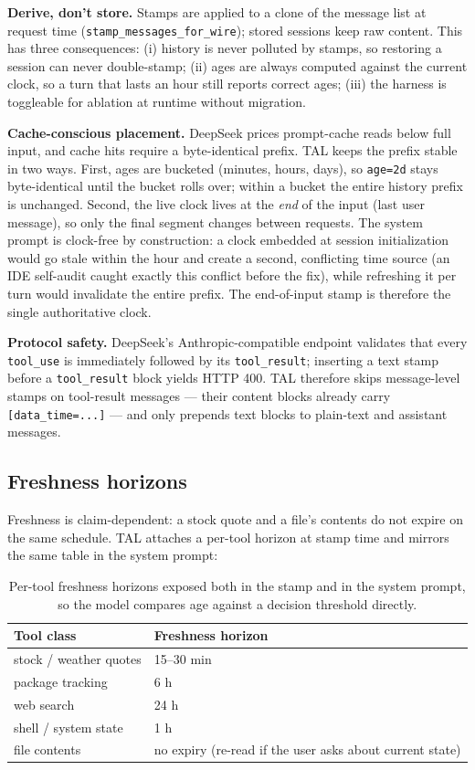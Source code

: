 \documentclass[10pt]{article}
\begin{document}
\textbf{Derive, don't store.} Stamps are applied to a clone of the message list at
request time (\texttt{stamp\_messages\_for\_wire}); stored sessions keep raw
content. This has three consequences: (i) history is never polluted by stamps, so
restoring a session can never double-stamp; (ii) ages are always computed against the
current clock, so a turn that lasts an hour still reports correct ages; (iii) the
harness is toggleable for ablation at runtime without migration.

\textbf{Cache-conscious placement.} DeepSeek prices prompt-cache reads below full
input, and cache hits require a byte-identical prefix. TAL keeps the prefix stable in
two ways. First, ages are bucketed (minutes, hours, days), so \texttt{age=2d} stays
byte-identical until the bucket rolls over; within a bucket the entire history prefix
is unchanged. Second, the live clock lives at the \emph{end} of the input (last user
message), so only the final segment changes between requests. The system prompt is
clock-free by construction: a clock embedded at session initialization would go
stale within the hour and create a second, conflicting time source (an IDE
self-audit caught exactly this conflict before the fix), while refreshing it per
turn would invalidate the entire prefix. The end-of-input stamp is therefore the
single authoritative clock.

\textbf{Protocol safety.} DeepSeek's Anthropic-compatible endpoint validates that
every \texttt{tool\_use} is immediately followed by its \texttt{tool\_result};
inserting a text stamp before a \texttt{tool\_result} block yields HTTP 400. TAL
therefore skips message-level stamps on tool-result messages --- their content blocks
already carry \texttt{[data\_time=...]} --- and only prepends text blocks to
plain-text and assistant messages.

\subsection{Freshness horizons}
\label{sec:horizons}

Freshness is claim-dependent: a stock quote and a file's contents do not expire on
the same schedule. TAL attaches a per-tool horizon at stamp time and mirrors the same
table in the system prompt:

\begin{table}[h]
  \centering
  \small
  \begin{tabular}{ll}
    \toprule
    Tool class & Freshness horizon \\
    \midrule
    stock / weather quotes & 15--30 min \\
    package tracking & 6 h \\
    web search & 24 h \\
    shell / system state & 1 h \\
    file contents & no expiry (re-read if the user asks about current state) \\
    \bottomrule
  \end{tabular}
  \caption{Per-tool freshness horizons exposed both in the stamp and in the system
  prompt, so the model compares age against a decision threshold directly.}
  \label{tab:horizons}
\end{table}
\end{document}
